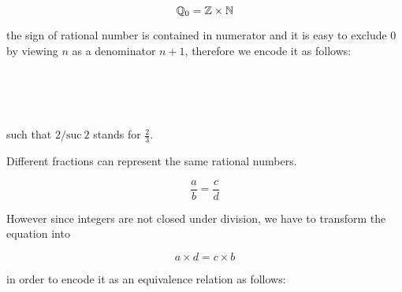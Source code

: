 $$\mathbb{Q}_0 = \mathbb{Z} \times \mathbb{N}$$

the sign of rational number is contained in numerator and it is easy to exclude $0$ by viewing $n$ as a denominator $n + 1$, therefore we encode it as follows:

\begin{code}\>\<%
\\
\>  \AgdaSymbol{:}  \<%
\\
\>[0]\<[2]%
\>[2] \AgdaSymbol{:} \AgdaSymbol{(} \AgdaSymbol{:} \AgdaSymbol{)}  \AgdaSymbol{(} \AgdaSymbol{:} \AgdaSymbol{)}  \<%
\\
\>\<\end{code}

such that $2 /\text{suc}~ 2$ stands for $\frac{2}{3}$.




Different fractions can represent the same rational numbers.

$$ \frac{a}{b} = \frac{c}{d} $$

However since integers are not closed under division, we have to transform the equation into

$$a \times d = c \times b $$

in order to encode it as an equivalence relation as follows:

\begin{code}\>\<%
\\
\> \<[6]%
\>[6]\AgdaSymbol{:}     \<%
\\
\>       \AgdaSymbol{=} \<[27]%
\>[27]  \AgdaSymbol{(}\AgdaInductiveConstructor{+}  \AgdaSymbol{)}    \AgdaSymbol{(}\AgdaInductiveConstructor{+}  \AgdaSymbol{)}\<%
\\
\>\<\end{code}

